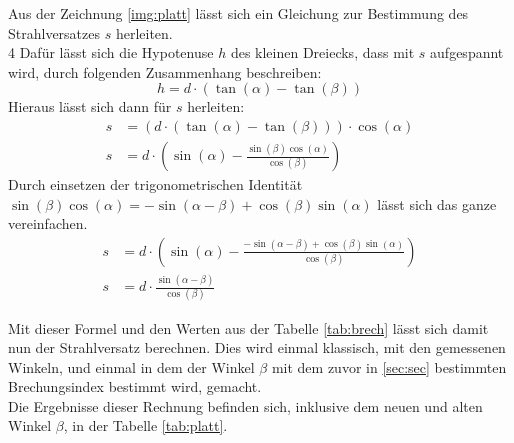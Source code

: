 \noindent Aus der Zeichnung \ref{img:platt} lässt sich ein Gleichung zur Bestimmung des Strahlversatzes $s$ herleiten.\\4
Dafür lässt sich die Hypotenuse $h$ des kleinen Dreiecks, dass mit $s$ aufgespannt wird, durch folgenden Zusammenhang beschreiben:
\begin{equation*}
    h=d\cdot \left( \tan(\alpha)-\tan(\beta)   \right)
\end{equation*}
Hieraus lässt sich dann für $s$ herleiten:
\begin{align*}
    s&=\left( d\cdot \left( \tan(\alpha)-\tan(\beta)   \right) \right) \cdot \cos(\alpha)\\
    s&=d \cdot \left(\sin(\alpha) - \frac{\sin(\beta) \cos(\alpha)}{\cos(\beta)} \right)
\end{align*}
Durch einsetzen der trigonometrischen Identität $\sin(\beta) \cos(\alpha)= -\sin(\alpha-\beta)+\cos(\beta)\sin(\alpha)$ lässt sich das ganze vereinfachen.
\begin{align*}
    s&=d \cdot \left(\sin(\alpha) - \frac{-\sin(\alpha-\beta)+\cos(\beta)\sin(\alpha)}{\cos(\beta)} \right)\\
    s&= d\cdot \frac{\sin(\alpha-\beta)}{\cos(\beta)}
\end{align*}


\noindent Mit dieser Formel und den Werten aus der Tabelle \ref{tab:brech} 
lässt sich damit nun der Strahlversatz berechnen.
Dies wird einmal klassisch, mit den gemessenen Winkeln, und einmal in dem der Winkel $\beta$ mit dem zuvor in \ref{sec:sec} bestimmten Brechungsindex bestimmt wird, gemacht.\\
Die Ergebnisse dieser Rechnung befinden sich, inklusive dem neuen und alten Winkel $\beta$, in der Tabelle \ref{tab:platt}.\\\\

